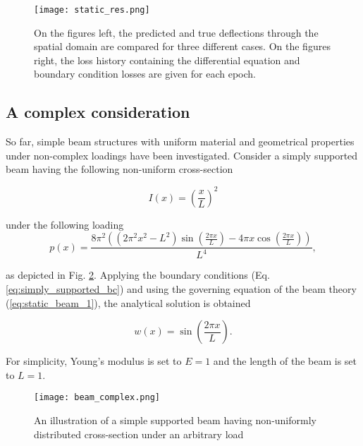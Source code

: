 \begin{figure}[t]
    \centering
    \texttt{[image: static\_res.png]}  
    \caption{On the figures left, the predicted and true deflections through the spatial domain are compared for
    three different cases. On the figures right, the loss history containing the differential equation and
    boundary condition losses are given for each epoch.}
    \label{fig:static_res}
\end{figure}

\clearpage

\subsection{A complex consideration}

So far, simple beam structures with uniform material and geometrical properties under non-complex
loadings have been investigated. Consider a simply supported beam having the following non-uniform cross-section 

\begin{equation}
    I(x) = \left( \frac{x}{L} \right)^{2}
\end{equation}

under the following loading
\begin{equation}
    p(x)=\frac{8\pi^{2}\left(\left(2 \pi^{2} x^{2}-L^{2}\right) \sin (\frac{2 \pi x}{L})-4 \pi x \cos (\frac{2 \pi x}{L})\right)}{L^{4}},
\end{equation}


as depicted in Fig. \ref{fig:beam_complex}. Applying the boundary conditions (Eq. \ref{eq:simply_supported_bc})
and using the governing equation of the beam theory (\ref{eq:static_beam_1}), the analytical solution is obtained

\begin{equation}
    w(x) = \sin (\frac{2\pi x}{L}).
\end{equation}

For simplicity, Young's modulus is set to $E=1$ and the length of the beam is set to $L=1$. 

\begin{figure}[!hb]
    \centering
    \texttt{[image: beam\_complex.png]}  
    \caption{An illustration of a simple supported beam having non-uniformly distributed cross-section under an arbitrary load}
    \label{fig:beam_complex}
\end{figure}


